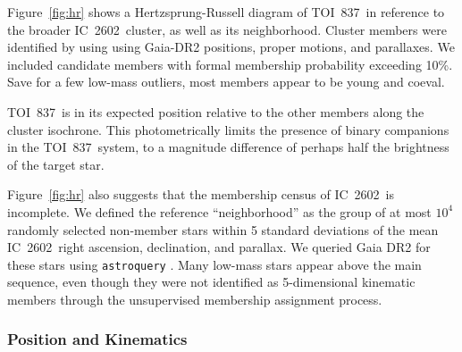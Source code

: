 \documentclass[12pt,twocolumn,tighten]{aastex62}
\newcommand{\tn}{TOI~837} %
\newcommand{\cn}{IC~2602} %
\begin{document}
Figure~\ref{fig:hr} shows a Hertzsprung-Russell diagram of \tn\ in
reference to the broader \cn\ cluster, as well as its neighborhood.
Cluster members were identified by \citet{cantatgaudin_gaia_2018}
using using Gaia-DR2 positions, proper motions, and parallaxes.  
We included candidate members with formal membership probability
exceeding 10\%.  Save for a few low-mass outliers, most members appear
to be young and coeval.

\tn\ is in its expected position relative to the other members along
the cluster isochrone.  This photometrically limits the presence of
binary companions in the \tn\ system, to a magnitude difference of
perhaps half the brightness of the target star.

Figure~\ref{fig:hr} also suggests that the membership census of \cn\
is incomplete.  We defined the reference ``neighborhood'' as the group
of at most $10^4$ randomly selected non-member stars within 5 standard
deviations of the mean \cn\ right ascension, declination, and
parallax.  We queried Gaia DR2 for these stars using
\texttt{astroquery} \citep{astroquery_2018}.  Many low-mass stars
appear above the main sequence, even though they were not identified
as 5-dimensional kinematic members through the unsupervised
\citet{cantat-gaudin_gaia_2018} membership assignment process.


\subsubsection{Position and Kinematics}
\end{document}
